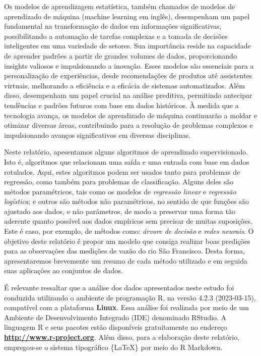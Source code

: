 \documentclass[11pt,]{article}
\begin{document}
Os modelos de aprendizagem estatística, também chamados de modelos de
aprendizado de máquina (machine learning em inglês), desempenham um
papel fundamental na transformação de dados em informações
significativas, possibilitando a automação de tarefas complexas e a
tomada de decisões inteligentes em uma variedade de setores. Sua
importância reside na capacidade de aprender padrões a partir de grandes
volumes de dados, proporcionando insights valiosos e impulsionando a
inovação. Esses modelos são essenciais para a personalização de
experiências, desde recomendações de produtos até assistentes virtuais,
melhorando a eficiência e a eficácia de sistemas automatizados. Além
disso, desempenham um papel crucial na análise preditiva, permitindo
antecipar tendências e padrões futuros com base em dados históricos. À
medida que a tecnologia avança, os modelos de aprendizado de máquina
continuarão a moldar e otimizar diversas áreas, contribuindo para a
resolução de problemas complexos e impulsionando avanços significativos
em diversas disciplinas.

Neste relatório, apesentamos alguns algoritmos de aprendizado
supervisionado. Isto é, algoritmos que relacionam uma saída e uma
entrada com base em dados rotulados. Aqui, estes algoritmos podem ser
usados tanto para problemas de regressão, como também para problemas de
classificação. Alguns deles são métodos paramétricos, tais como os
modelos de \textit{regressão linear} e \textit{regressão logística}; e
outros são métodos não paramétricos, no sentido de que funções são
ajustado aos dados, e não parâmetros, de modo a preservar uma forma tão
aderente quanto possível aos dados empíricos sem precisar de muitas
suposições. Este é caso, por exemplo, de métodos como:
\textit{árvore de decisão} e \textit{redes neurais}. O objetivo deste
relatório é propor um modelo que consiga realizar boas predições para as
observações das medições de vazão do rio São Francisco. Desta forma,
apresentaremos brevemente um resumo de cada método utilizado e em
seguida suas aplicações ao conjuntos de dados.

É relevante ressaltar que a análise dos dados apresentados neste estudo
foi conduzida utilizando o ambiente de programação R, na versão 4.2.3
(2023-03-15), compatível com a plataforma \textbf{Linux}. Essa análise
foi realizada por meio de um Ambiente de Desenvolvimento Integrado (IDE)
denominado RStudio. A linguagem R e seus pacotes estão disponíveis
gratuitamente no endereço \href{url}{\textbf{http://www.r-project.org}}.
Além disso, para a elaboração deste relatório, empregou-se o sistema
tipográfico \{\LaTeX\} por meio do R Markdown.
\end{document}
